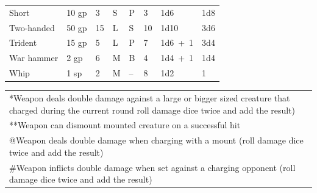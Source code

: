 \begin{minipage}{\textwidth}
\begin{tabular}{|p{}|p{}|p{}|p{}|p{}|p{}|p{}|p{}|}
\rowcolor[gray]{.9}\hspace{1em}Short				& 10 gp	& 3		& S	& P		& 3		& 1d6	& 1d8 \\
\hspace{1em}Two-handed		& 50 gp	& 15	& L	& S		& 10	& 1d10	& 3d6 \\
\rowcolor[gray]{.9}Trident				& 15 gp	& 5		& L	& P		& 7		& 1d6~+~1	& 3d4 \\
War hammer			& 2 gp	& 6		& M	& B		& 4		& 1d4~+~1	& 1d4 \\
\rowcolor[gray]{.9}Whip				& 1 sp	& 2		& M	& -- 	& 8		& 1d2	& 1 \\
\hline
\end{tabular}

\noindent
\begin{tabular}{p{}}
*Weapon deals double damage against a large or bigger sized creature that charged during the current round roll damage dice twice and add the result) \\
**Weapon can dismount mounted creature on a successful hit \\
@Weapon deals double damage when charging with a mount (roll damage dice twice and add the result) \\
\#Weapon inflicts double damage when set against a charging opponent (roll damage dice twice and add the result) \\
\end{tabular}\vspace{.5em}

\end{minipage}


